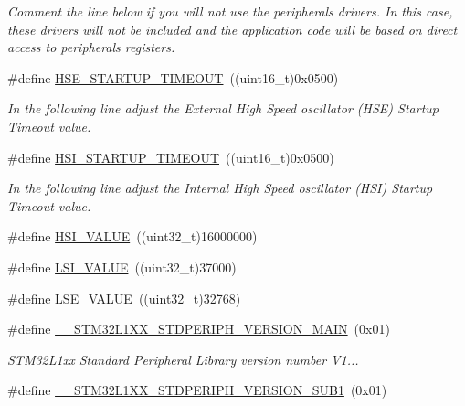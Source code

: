 \begin{DoxyCompactItemize}
\begin{DoxyCompactList}\small\item\em Comment the line below if you will not use the peripherals drivers. In this case, these drivers will not be included and the application code will be based on direct access to peripherals registers. \end{DoxyCompactList}\item 
\#define \hyperlink{group___library__configuration__section_ga68ecbc9b0a1a40a1ec9d18d5e9747c4f}{H\-S\-E\-\_\-\-S\-T\-A\-R\-T\-U\-P\-\_\-\-T\-I\-M\-E\-O\-U\-T}~((uint16\-\_\-t)0x0500)
\begin{DoxyCompactList}\small\item\em In the following line adjust the External High Speed oscillator (H\-S\-E) Startup Timeout value. \end{DoxyCompactList}\item 
\#define \hyperlink{group___library__configuration__section_ga83f109da654b670743786c6a45284b96}{H\-S\-I\-\_\-\-S\-T\-A\-R\-T\-U\-P\-\_\-\-T\-I\-M\-E\-O\-U\-T}~((uint16\-\_\-t)0x0500)
\begin{DoxyCompactList}\small\item\em In the following line adjust the Internal High Speed oscillator (H\-S\-I) Startup Timeout value. \end{DoxyCompactList}\item 
\#define \hyperlink{group___library__configuration__section_gaaa8c76e274d0f6dd2cefb5d0b17fbc37}{H\-S\-I\-\_\-\-V\-A\-L\-U\-E}~((uint32\-\_\-t)16000000)
\item 
\#define \hyperlink{group___library__configuration__section_ga4872023e65449c0506aac3ea6bec99e9}{L\-S\-I\-\_\-\-V\-A\-L\-U\-E}~((uint32\-\_\-t)37000)
\item 
\#define \hyperlink{group___library__configuration__section_ga7bbb9d19e5189a6ccd0fb6fa6177d20d}{L\-S\-E\-\_\-\-V\-A\-L\-U\-E}~((uint32\-\_\-t)32768)
\item 
\#define \hyperlink{group___library__configuration__section_ga960637daccd901a9725144cbf60b72a8}{\-\_\-\-\_\-\-S\-T\-M32\-L1\-X\-X\-\_\-\-S\-T\-D\-P\-E\-R\-I\-P\-H\-\_\-\-V\-E\-R\-S\-I\-O\-N\-\_\-\-M\-A\-I\-N}~(0x01)
\begin{DoxyCompactList}\small\item\em S\-T\-M32\-L1xx Standard Peripheral Library version number V1... \end{DoxyCompactList}\item 
\#define \hyperlink{group___library__configuration__section_gafdc6317be85b75e56a284dc3d9eb2eb9}{\-\_\-\-\_\-\-S\-T\-M32\-L1\-X\-X\-\_\-\-S\-T\-D\-P\-E\-R\-I\-P\-H\-\_\-\-V\-E\-R\-S\-I\-O\-N\-\_\-\-S\-U\-B1}~(0x01)

\end{DoxyCompactItemize}

